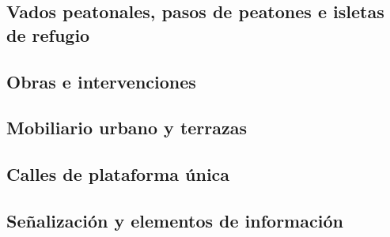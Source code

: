 \subsection{Vados peatonales, pasos de peatones e isletas de refugio}

\subsection{Obras e intervenciones}

\subsection{Mobiliario urbano y terrazas}

\subsection{Calles de plataforma única}

\subsection{Señalización y elementos de información}